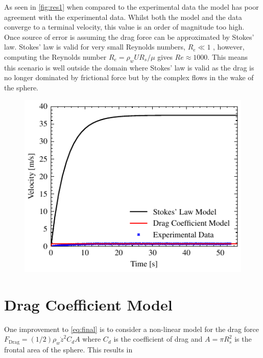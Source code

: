 \documentclass[10pt,a4paper, twocolumn]{article}
\begin{document}
	As seen in \autoref{fig:res1} when compared to the experimental data the model has poor agreement with the experimental data. Whilst both the model and the data converge to a terminal velocity, this value is an order of magnitude too high. Once source of error is assuming the drag force can be approximated by Stokes' law. Stokes' law is valid for very small Reynolds numbers, $R_e \ll 1$ \cite{white_fluid_2009}, however, computing the Reynolds number $R_e = \rho_w U R_s/\mu$ gives $Re \approx 1000$. This means this scenario is well outside the domain where Stokes' law is valid as the drag is no longer dominated by frictional force but by the complex flows in the wake of the sphere.
	
	\begin{figure}[!h]
		\centering
			\centering
			\includegraphics[width=\linewidth]{../all_comparison}
			\label{fig:res1}
	\end{figure}
	
	\section{Drag Coefficient Model}
	
	One improvement to \autoref{eq:final} is to consider a non-linear model for the drag force $F_{\text{Drag}} = (1/2)\rho_w \dot{z}^2 C_d A$ where $C_d$ is the coefficient of drag and $A = \pi R_s^2$ is the frontal area of the sphere. This results in
	
\end{document}
